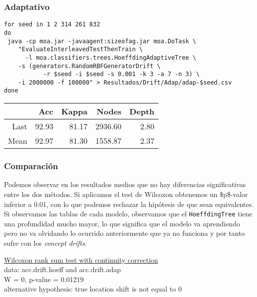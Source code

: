 \documentclass[11pt]{article}
\begin{document}
\subsubsection{Adaptativo}
\label{sec:org1ef858e}

\begin{verbatim}
for seed in 1 2 314 261 832
do 
 java -cp moa.jar -javaagent:sizeofag.jar moa.DoTask \
    "EvaluateInterleavedTestThenTrain \
      -l moa.classifiers.trees.HoeffdingAdaptiveTree \
	-s (generators.RandomRBFGeneratorDrift \
	       -r $seed -i $seed -s 0.001 -k 3 -a 7 -n 3) \
	-i 2000000 -f 100000" > Resultados/Drift/Adap/adap-$seed.csv
done
\end{verbatim}


\begin{table}[ht]
\centering
\begin{tabular}{rrrrr}
  \hline
 & Acc & Kappa & Nodes & Depth \\ 
  \hline
Last & 92.93 & 81.17 & 2936.60 & 2.80 \\ 
  Mean & 92.97 & 81.30 & 1558.87 & 2.37 \\ 
   \hline
\end{tabular}
\end{table}


\subsubsection{Comparación}
\label{sec:orga7688d4}

Podemos observar en los resultados medios que no hay diferencias
significativas entre los dos métodos. Si aplicamos el test de
Wilcoxon obtenemos un \$p\$-valor inferior a 0.01, con lo que podemos
rechazar la hipótesis de que sean equivalentes. Si observamos las
tablas de cada modelo, observamos que el \texttt{HoeffdingTree} tiene una
profundidad mucho mayor, lo que significa que el modelo va
aprendiendo pero no va olvidando lo ocurrido anteriormente que ya no
funciona y por tanto sufre con los \emph{concept drifts}.


	\underline{Wilcoxon rank sum test with continuity correction}\\

data:  acc.drift.hoeff and acc.drift.adap\\
W = 0, p-value = 0.01219\\
alternative hypothesis: true location shift is not equal to 0
\end{document}

